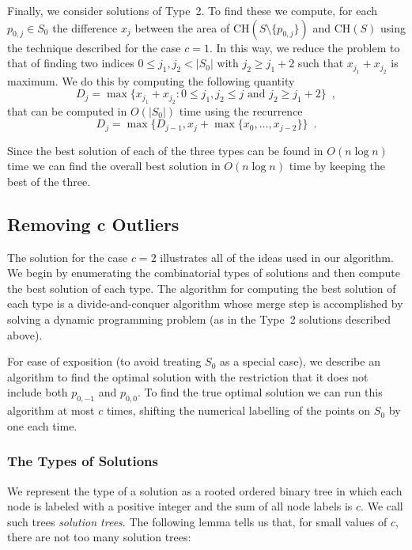 \documentclass[lotsofwhite]{patmorin}
\newcommand{\ch}{\mathrm{CH}}
\begin{document}
Finally, we consider solutions of Type~2.  To find these we compute,
for each $p_{0,j}\in S_0$ the difference $x_j$ between the area of
$\ch(S\setminus\{p_{0,j}\})$ and $\ch(S)$ using the technique
described for the case $c=1$.  In this way, we reduce the problem to
that of finding two indices $0\le j_1,j_2< |S_0|$ with $j_2\ge j_1+2$
such that $x_{j_1}+x_{j_2}$ is maximum.  We do this by computing the
following quantity
\[
     D_j = \max\{x_{j_1}+x_{j_2} :
       \mbox{$0\le j_1,j_2\le j$ and $j_2 \ge j_1+2$}\} \enspace ,
\]
that can be computed in $O(|S_0|)$ time using the recurrence
\[
    D_j = \max\{D_{j-1}, x_{j} + \max\{x_{0},\ldots,x_{j-2}\}\}
                \enspace .
\]

Since the best solution of each of the three types can be found in
$O(n\log n)$ time we can find the overall best solution in $O(n\log
n)$ time by keeping the best of the three.

\subsection{Removing $\mathbf{c}$ Outliers}

The solution for the case $c=2$ illustrates all of the ideas used in 
our algorithm.  We begin by enumerating the combinatorial types of
solutions and then compute the best solution of each type.  The
algorithm for computing the best solution of each type is a
divide-and-conquer algorithm whose merge step is accomplished by
solving a dynamic programming problem (as in the Type~2 solutions
described above).

For ease of exposition (to avoid treating $S_0$ as a special case), we
describe an algorithm to find the optimal solution with the
restriction that it does not include both $p_{0,-1}$ and $p_{0,0}$.
To find the true optimal solution we can run this algorithm at most
$c$ times, shifting the numerical labelling of the points on $S_0$ by
one each time.

\subsubsection{The Types of Solutions}

We represent the type of a solution as a rooted ordered binary tree in
which each node is labeled with a positive integer and the sum of all
node labels is $c$.  We call such trees \emph{solution trees}.  The
following lemma tells us that, for small values of $c$, there are not
too many solution trees:
 
\end{document}
